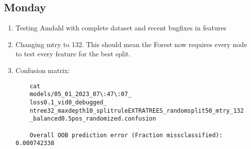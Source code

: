 \documentclass[12pt,oneside]{book}
\begin{document}
\subsection*{Monday}
\begin{enumerate}
  \item Testing Amdahl with complete dataset and recent bugfixes in features
  \item Changing mtry to 132. This should mean the Forest now requires every node to test every feature for the best split.
  \item Confusion matrix:
  \begin{lstlisting}
    cat 
    models/05_01_2023_07\:47\:07_
    loss0.1_vid0_debugged_
    ntree32_maxdepth10_splitruleEXTRATREES_randomsplit50_mtry_132
    _balanced0.5pos_randomized.confusion 

    Overall OOB prediction error (Fraction missclassified): 0.000742338


\end{lstlisting}
\end{enumerate}
\end{document}
